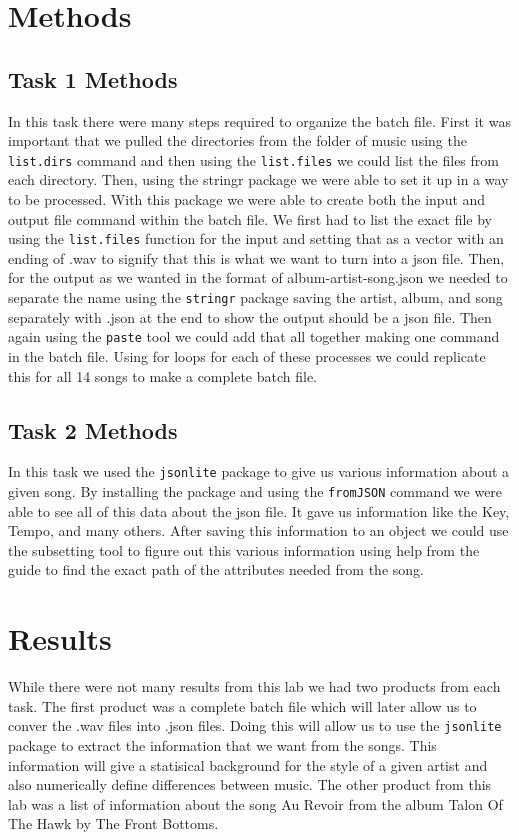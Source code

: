 \documentclass{article}\usepackage[]{graphicx}\usepackage[]{xcolor}
\begin{document}
\begin{multicols}{2}
\section{Methods}


\subsection{Task 1 Methods}

In this task there were many steps required to organize the batch file. First it was important that we pulled the directories from the folder of music using the \texttt{list.dirs} command and then using the \texttt{list.files} we could list the files from each directory. Then, using the stringr package we were able to set it up in a way to be processed. With this package we were able to create both the input and output file command within the batch file. We first had to list the exact file by using the \texttt{list.files} function for the input and setting that as a vector with an ending of .wav to signify that this is what we want to turn into a json file. Then, for the output as we wanted in the format of album-artist-song.json we needed to separate the name using the \texttt{stringr} package saving the artist, album, and song separately with .json at the end to show the output should be a json file. Then again using the \texttt{paste} tool we could add that all together making one command in the batch file. Using for loops for each of these processes we could replicate this for all 14 songs to make a complete batch file. 
\subsection{Task 2 Methods}

In this task we used the \texttt{jsonlite} package to give us various information about a given song. By installing the package and using the \texttt{fromJSON} command we were able to see all of this data about the json file. It gave us information like the Key, Tempo, and many others. After saving this information to an object we could use the subsetting tool to figure out this various information using help from the guide to find the exact path of the attributes needed from the song. 

\section{Results}
While there were not many results from this lab we had two products from each task. The first product was a complete batch file which will later allow us to conver the .wav files into .json files. Doing this will allow us to use the \texttt{jsonlite} package to extract the information that we want from the songs. This information will give a statisical background for the style of a given artist and also numerically define differences between music. The other product from this lab was a list of information about the song Au Revoir from the album Talon Of The Hawk by The Front Bottoms. 



\end{multicols}
\end{document}
